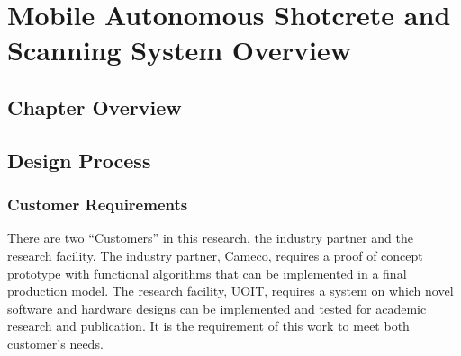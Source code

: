 \chapter{Mobile Autonomous Shotcrete and Scanning System Overview}
\label{chap:overview}
\section{Chapter Overview}
\section{Design Process}
\label{sec:design}
\subsection{Customer Requirements}
There are two ``Customers'' in this research, the industry partner and the research facility. The industry partner, Cameco, requires a proof of concept prototype with functional algorithms that can be implemented in a final production model. The research facility, UOIT, requires a system on which novel software and hardware designs can be implemented and tested for academic research and publication. It is the requirement of this work to meet both customer's needs.\\

